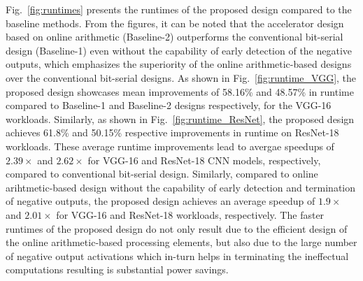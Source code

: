 \documentclass[conference]{IEEEtran}
\begin{document}
Fig.~\ref{fig:runtimes} presents the runtimes of the proposed design compared to the baseline methods. From the figures, it can be noted that the accelerator design based on online arithmetic (Baseline-2) outperforms the conventional bit-serial design (Baseline-1) even without the capability of early detection of the negative outputs, which emphasizes the superiority of the online arithmetic-based designs over the conventional bit-serial designs. As shown in Fig.~\ref{fig:runtime_VGG}, the proposed design showcases mean improvements of 58.16\% and 48.57\% in runtime compared to Baseline-1 and Baseline-2 designs respectively, for the VGG-16 workloads. Similarly, as shown in Fig.~\ref{fig:runtime_ResNet}, the proposed design achieves 61.8\% and 50.15\% respective improvements in runtime on ResNet-18 workloads. These average runtime improvements lead to avergae speedups of \(2.39\times\) and \(2.62\times\) for VGG-16 and ResNet-18 CNN models, respectively, compared to conventional bit-serial design. Similarly, compared to online arihtmetic-based design without the capability of early detection and termination of negative outputs, the proposed design achieves an average speedup of \(1.9\times\) and \(2.01\times\) for VGG-16 and ResNet-18 workloads, respectively. The faster runtimes of the proposed design do not only result due to the efficient design of the online arithmetic-based processing elements, but also due to the large number of negative output activations which in-turn helps in terminating the ineffectual computations resulting is substantial power savings.
\end{document}
